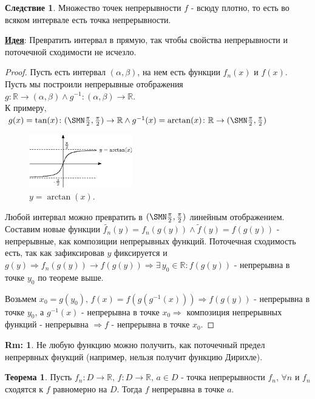 \documentclass[12pt]{article}
\newcommand{\MR}{\mathbb{R}}
\theoremstyle{definition}
\newtheorem{rem}{Rm:}
\newtheorem{theorem}{Теорема}
\newtheorem{corollary}{Следствие}
\begin{document}
\begin{corollary}
	Множество точек непрерывности $f$ - всюду плотно, то есть во всяком интервале есть точка непрерывности.
\end{corollary}
\uline{\textbf{Идея}}: Превратить интервал в прямую, так чтобы свойства непрерывности и поточечной сходимости не исчезло.
\begin{proof}
	Пусть есть интервал $(\alpha, \beta)$, на нем есть функции $f_n(x)$ и $f(x)$. Пусть мы построили непрерывные отображения $g \colon \MR \to (\alpha, \beta) \wedge g^{-1}\colon (\alpha, \beta) \to \MR $. \\
	К примеру, $g(x) = \tan(x) \colon (\SMN\frac{\pi}{2}, \frac{\pi}{2}) \to \MR \wedge g^{-1}(x) = \arctan(x) \colon \MR \to (\SMN\frac{\pi}{2}, \frac{\pi}{2})$
	\begin{figure}[H]
		\centering
		\includegraphics[width=0.4\textwidth]{21_1.eps}
		\caption{$y = \arctan(x)$.}
		\label{21_1}
	\end{figure}
	Любой интервал можно превратить в $(\SMN\frac{\pi}{2}, \frac{\pi}{2})$ линейным отображением. Составим новые функции $\tilde{f_n}(y) = f_n(g(y)) \wedge \tilde{f}(y) = f(g(y))$ - непрерывные, как композиции непрерывных функций. Поточечная сходимость есть, так как зафиксировав $y$ фиксируется и $g(y) \Rightarrow f_n(g(y)) \to f(g(y)) \Rightarrow \exists \, y_0 \in \MR \colon f(g(y))$ - непрерывна в точке $y_0$ по теореме выше.
	
	Возьмем $x_0 = g(y_0), \, f(x) = f(g(g^{-1}(x))) \Rightarrow f(g(y))$ - непрерывна в точке $y_0$, а $g^{-1}(x)$ - непрерывна в точке $x_0 \Rightarrow$ композиция непрерывных функций - непрерывна $\Rightarrow f$ - непрерывна в точке $x_0$.
\end{proof}
\begin{rem}
	Не любую функцию можно получить, как поточечный предел непрервных фнукций (например, нельзя получит функцию Дирихле).
\end{rem}

\begin{theorem}
	Пусть $f_n \colon D \to \MR, \, f \colon D \to \MR, \, a\in D$ - точка непрерывности $f_n, \, \forall n$ и $f_n$ сходятся к $f$ равномерно на $D$. Тогда $f$ непрерывна в точке $a$.
\end{theorem}
\end{document}
